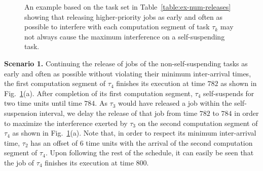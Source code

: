 \begin{figure}[t]
{{} }
\caption{An example based on the task set in Table~\ref{table:ex-num-releases} showing that releasing higher-priority jobs as early and often as possible to interfere with each computation segment of task $\tau_k$ may not always cause the maximum interference on a self-suspending task.}
\label{fig:ex_crit_inst2}
\end{figure}

\noindent\textbf{Scenario 1.} Continuing the release of jobs of the non-self-suspending tasks as early and often as possible without violating their minimum inter-arrival times, the first computation segment of $\tau_4$ finishes its execution at time $782$ as shown in Fig.~\ref{fig:ex_crit_inst2}(a). After completion of its first computation segment, $\tau_4$ self-suspends for two time units until time $784$. As $\tau_3$ would have released a job within the self-suspension interval, we delay the release of that job from time $782$ to $784$ in order to maximize the interference exerted by $\tau_3$ on the second computation segment of $\tau_4$ as shown in Fig.~\ref{fig:ex_crit_inst2}(a). Note that, in order to respect its minimum inter-arrival time, $\tau_2$ has an offset of $6$ time units with the arrival of the second computation segment of $\tau_4$. Upon following the rest of the schedule, it can easily be seen that the job of $\tau_4$ finishes its execution at time $800$.

